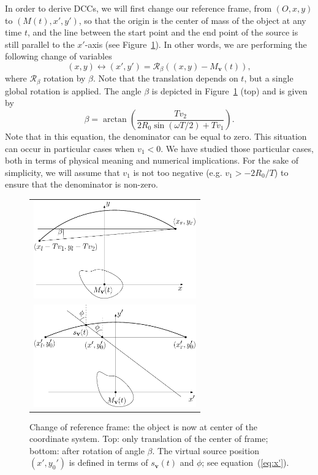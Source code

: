 \documentclass[twocolumn]{IEEEtran}
\newcommand{\Mbv}{M_{\mathbf{v}}}
\newcommand{\sbv}{s_{\mathbf{v}}}
\begin{document}
In order to derive DCCs, we will first change our reference frame, from $\left(O, x, y\right)$ to $\left(M(t), x', y'\right)$, so that the origin is the center of mass of the object at any time $t$, and the line between the start point and the end point of the source is still parallel to the $x'$-axis (see Figure~\ref{fig:change_frame}). In other words, we are performing the following change of variables
\begin{equation}
	(x,y) \leftrightarrow (x',y') = \mathcal{R}_{\beta} \left( (x,y)-\Mbv(t) \right),
\end{equation}
where $\mathcal{R}_{\beta}$ rotation by $\beta$. Note that the translation depends on $t$, but a single global rotation is applied. The angle $\beta$ is depicted in Figure~\ref{fig:change_frame} (top) and is given by
\begin{equation}
	\beta = \arctan \left( \frac{T v_2}{2R_0 \sin(\omega T/2) + T v_1} \right).
\end{equation}
Note that in this equation, the denominator can be equal to zero. This situation can occur in particular cases when $v_1 < 0$. We have studied those particular cases, both in terms of physical meaning and numerical implications. For the sake of simplicity, we will assume that $v_1$ is not too negative (e.g. $v_1 > - 2 R_0 / T$) to ensure that the denominator is non-zero.

\begin{figure}[!ht]
	\centering
	\begin{tabular}{c}
	\includegraphics[width=70mm]{figs/frame_object_before_rotation.eps} \\
	\includegraphics[width=70mm]{figs/frame_object.eps}
	\end{tabular}
	\caption{Change of reference frame: the object is now at center of the coordinate system. Top: only translation of the center of frame; bottom: after rotation of angle $\beta$. The virtual source position $(x',y_0')$ is defined in terms of $\sbv(t)$ and $\phi$; see equation~(\ref{eq:x'}).\label{fig:change_frame}}
\end{figure}
\end{document}
